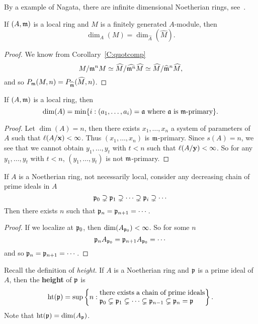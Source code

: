 \documentclass{ximera}
\begin{document}
\begin{remark}
  By a example of Nagata, there are infinite dimensional Noetherian
  rings, see~\cite{mN1962}.
\end{remark}


\begin{corollary}
  If $(A,\mathfrak{m})$ is a local ring and $M$ is a finitely generated
  $A$-module, then
  \[
  \dim_A(M) =\dim_{\hat{A}}(\hat{M}).
  \]
  \begin{proof}
    We know from Corollary~\ref{C:quotcomp}
    \[
    M/\mathfrak{m}^n M \simeq \widehat{M}/\widehat{\mathfrak{m}^n} \widehat{M} \simeq \widehat{M}/ \widehat{\mathfrak{m}}^n\widehat{M},
    \]
    and so $P_{\mathfrak{m}}(M,n) = P_{\widehat{\mathfrak{m}}}(\widehat{M},n)$.
  \end{proof}
\end{corollary}



\begin{corollary}
  If $(A,\mathfrak{m})$ is a local ring, then 
  \[
  \dim(A) = \min\{i: (a_1,\dots,a_i) = \mathfrak{a}\text{ where $\mathfrak{a}$ is $\mathfrak{m}$-primary}\}.
  \]
  \begin{proof}
    Let $\dim(A) = n$, then there exists $x_1,\dots,x_n$ a system of
    parameters of $A$ such that $\ell(A/\mathbf{x}) <\infty$. Thus
    $(x_1,\dots,x_n)$ is $\mathfrak{m}$-primary.  Since $s(A) = n$, we see that
    we cannot obtain $y_1,\dots,y_t$ with $t<n$ such that
    $\ell(A/\mathbf{y})<\infty$.  So for any $y_1,\ldots,y_t$ with $t <
    n$, $(y_1,\ldots,y_t)$ is not $\mathfrak{m}$-primary.
  \end{proof}
\end{corollary}


\begin{corollary}
  If $A$ is a Noetherian ring, not necessarily local, consider any decreasing chain of prime ideals in $A$ 
  \[
  \mathfrak{p}_0\supsetneq \mathfrak{p}_1\supsetneq \cdots \supsetneq \mathfrak{p}_i\supsetneq \cdots
  \]
  Then there exists $n$ such that $\mathfrak{p}_n = \mathfrak{p}_{n+1} = \cdots$.
  \begin{proof}
    If we localize at $\mathfrak{p}_0$, then $\dim(A_{\mathfrak{p}_0}) <\infty$.  So for some $n$
    \[
    \mathfrak{p}_n A_{\mathfrak{p}_0} = \mathfrak{p}_{n+1} A_{\mathfrak{p}_0} = \cdots
    \]
    and so $\mathfrak{p}_n = \mathfrak{p}_{n+1} = \cdots$.
\end{proof}
\end{corollary}

Recall the definition of \textit{height}. If $A$ is a Noetherian ring
and $\mathfrak{p}$ is a prime ideal of $A$, then the \textbf{height} of $\mathfrak{p}$ is
\[
\h(\p) = \sup\left\{n : \begin{minipage}{15em}there exists a chain of prime ideals $\p_0\subsetneq \p_1 \subsetneq \cdots \subsetneq \p_{n-1}\subsetneq \p_n =\p$\end{minipage} \right\}.
\]
Note that $\operatorname{ht}(\mathfrak{p}) = \dim(A_{\mathfrak{p}})$.
\end{document}
